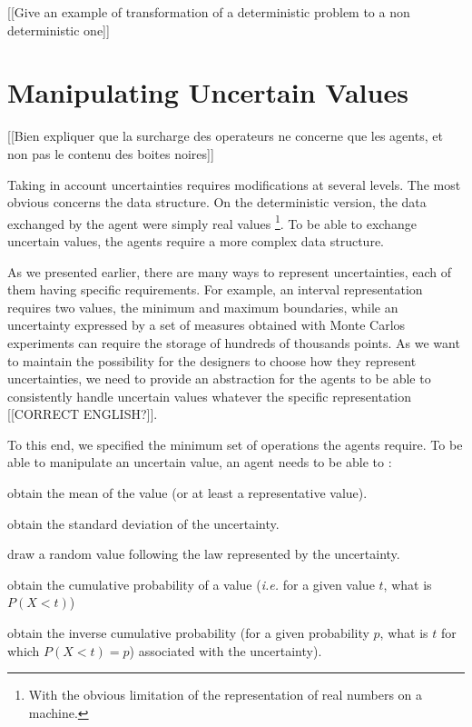 [[Give an example of transformation of a deterministic problem to a non deterministic one]]

\section{Manipulating Uncertain Values}

[[Bien expliquer que la surcharge des operateurs ne concerne que les agents, et non pas le contenu des boites noires]]

Taking in account uncertainties requires modifications at several levels. The most obvious concerns the data structure. On the deterministic version, the data exchanged by the agent were simply real values \footnote{With the obvious limitation of the representation of real numbers on a machine.}. To be able to exchange uncertain values, the agents require a more complex data structure.

As we presented earlier, there are many ways to represent uncertainties, each of them having specific requirements. For example, an interval representation requires two values, the minimum and maximum boundaries, while an uncertainty expressed by a set of measures obtained with Monte Carlos experiments can require the storage of hundreds of thousands points. As we want to maintain the possibility for the designers to choose how they represent uncertainties, we need to provide an abstraction for the agents to be able to consistently handle uncertain values whatever the specific representation [[CORRECT ENGLISH?]].

To this end, we specified the minimum set of operations the agents require. To be able to manipulate an uncertain value, an agent needs to be able to :
\begin{compactitem}
\item obtain the mean of the value (or at least a representative value).
\item obtain the standard deviation of the uncertainty.
\item draw a random value following the law represented by the uncertainty.
\item obtain the cumulative probability of a value (\emph{i.e.} for a given value $t$, what is $P(X < t)$) 
\item obtain the inverse cumulative probability (for a given probability $p$, what is $t$ for which $P(X < t) = p$) associated with the uncertainty).
\end{compactitem}

